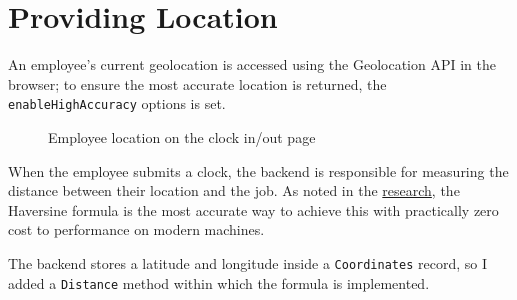 \section{Providing Location} \label{s:providingLocation}

An employee's current geolocation is accessed using the
Geolocation API in the browser; to ensure the most accurate
location is returned, the \lstinline{enableHighAccuracy}
options is set.

\begin{figure}[h]
  \centering
  \caption{Employee location on the clock in/out page}
\end{figure}

When the employee submits a clock, the backend is
responsible for measuring the distance between their
location and the job.
As noted in the \hyperref[ss:coordSystems]{research}, the
Haversine formula is the most accurate way to achieve this
with practically zero cost to performance on modern
machines.

The backend stores a latitude and longitude inside a
\lstinline{Coordinates} record, so I added a
\lstinline{Distance} method within which the formula is
implemented. 